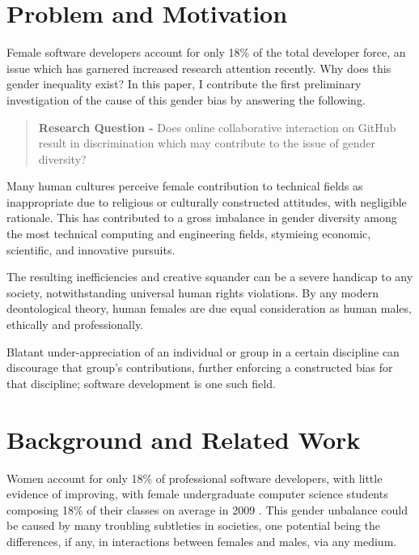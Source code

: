 \documentclass{sigplanconf}
\begin{document}
\section{Problem and Motivation}

Female software developers account for only 18\% of the total developer force,
an issue which has garnered increased research attention recently.
\citep{sherdiversity} Why does this gender inequality exist? In this paper, I
contribute the first preliminary investigation of the cause of this gender bias
by answering the following.

\begin{quote}
  \textbf{Research Question -} Does online collaborative interaction on GitHub result in
  discrimination which may contribute to the issue of gender diversity?
\end{quote}

Many human cultures perceive female contribution to technical
fields as inappropriate due to religious or culturally constructed attitudes, with
negligible rationale. \citep{elamin2010saudiwomen} This has contributed to a gross imbalance in gender diversity among
the most technical computing and engineering fields, stymieing economic,
scientific, and innovative pursuits.

The resulting inefficiencies and creative
squander can be a severe handicap to any society, notwithstanding universal human rights
violations. By any modern deontological theory, human females are due equal
consideration as human males, ethically and professionally.

Blatant under-appreciation of an individual or group in a certain
discipline can discourage that group's contributions, further enforcing a
constructed bias for that discipline; software development is one such
field.

\section{Background and Related Work}

Women account for only 18\% of professional software developers,
\cite{sherdiversity} with little evidence of improving, with female
undergraduate computer science students composing 18\% of
their classes on average in 2009 \cite{womenundergrad}. This gender unbalance could be caused by many troubling subtleties
in societies, one potential being the differences, if any, in interactions
between females and males, via any medium.
\end{document}
